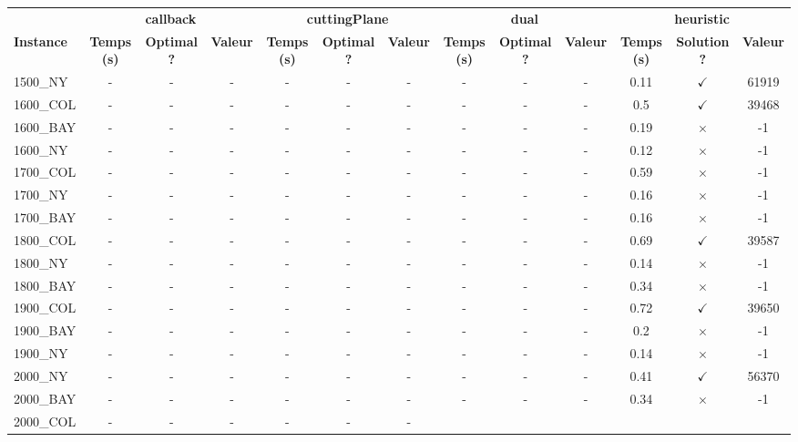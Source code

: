 \documentclass[main.tex]{subfiles}
\begin{document}
\begin{landscape}
\begin{center}
\renewcommand{\arraystretch}{1.4} 
 \begin{tabular}{lcccccccccccc}
	\hline
 & \multicolumn{3}{c}{\textbf{callback}} & \multicolumn{3}{c}{\textbf{cuttingPlane}} & \multicolumn{3}{c}{\textbf{dual}} & \multicolumn{3}{c}{\textbf{heuristic}}\\
\textbf{Instance}  & \textbf{Temps (s)} & \textbf{Optimal ?} & \textbf{Valeur} & \textbf{Temps (s)} & \textbf{Optimal ?} & \textbf{Valeur} & \textbf{Temps (s)} & \textbf{Optimal ?} & \textbf{Valeur} & \textbf{Temps (s)} & \textbf{Solution ?} & \textbf{Valeur}\\\hline

1500\_NY & - & - & - 
 & - & - & - 
 & - & - & - 
 & 0.11 & $\checkmark$ & 61919\\
1600\_COL & - & - & - 
 & - & - & - 
 & - & - & - 
 & 0.5 & $\checkmark$ & 39468\\
1600\_BAY & - & - & - 
 & - & - & - 
 & - & - & - 
 & 0.19 & $\times$ & -1\\
1600\_NY & - & - & - 
 & - & - & - 
 & - & - & - 
 & 0.12 & $\times$ & -1\\
1700\_COL & - & - & - 
 & - & - & - 
 & - & - & - 
 & 0.59 & $\times$ & -1\\
1700\_NY & - & - & - 
 & - & - & - 
 & - & - & - 
 & 0.16 & $\times$ & -1\\
1700\_BAY & - & - & - 
 & - & - & - 
 & - & - & - 
 & 0.16 & $\times$ & -1\\
1800\_COL & - & - & - 
 & - & - & - 
 & - & - & - 
 & 0.69 & $\checkmark$ & 39587\\
1800\_NY & - & - & - 
 & - & - & - 
 & - & - & - 
 & 0.14 & $\times$ & -1\\
1800\_BAY & - & - & - 
 & - & - & - 
 & - & - & - 
 & 0.34 & $\times$ & -1\\
1900\_COL & - & - & - 
 & - & - & - 
 & - & - & - 
 & 0.72 & $\checkmark$ & 39650\\
1900\_BAY & - & - & - 
 & - & - & - 
 & - & - & - 
 & 0.2 & $\times$ & -1\\
1900\_NY & - & - & - 
 & - & - & - 
 & - & - & - 
 & 0.14 & $\times$ & -1\\
2000\_NY & - & - & - 
 & - & - & - 
 & - & - & - 
 & 0.41 & $\checkmark$ & 56370\\
2000\_BAY & - & - & - 
 & - & - & - 
 & - & - & - 
 & 0.34 & $\times$ & -1\\
2000\_COL & - & - & - 
 & - & - & - 

\end{tabular}
\end{center}
\end{landscape}
\end{document}
